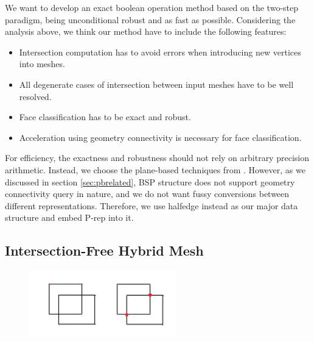 \documentclass[10pt,journal,compsoc]{IEEEtran}
\begin{document}
We want to develop an exact boolean operation method based on the two-step paradigm, being unconditional robust and as fast as possible. Considering the analysis above, we think our method have to include the following features:
\begin{itemize}
    \item Intersection computation has to avoid errors when introducing new vertices into meshes.
    \item All degenerate cases of intersection between input meshes have to be well resolved.
    \item Face classification has to be exact and robust.
    \item Acceleration using geometry connectivity is necessary for face classification.
\end{itemize}

For efficiency, the exactness and robustness should not rely on arbitrary precision arithmetic. Instead, we choose the plane-based techniques from \cite{campen2010exact}. However, as we discussed in section \ref{sec:pbrelated}, BSP structure does not support geometry connectivity query in nature, and we do not want fussy conversions between different representations. Therefore, we use halfedge instead as our major data structure and embed P-rep into it.

\subsection{Intersection-Free Hybrid Mesh}

\begin{figure}[t]
\centering
\includegraphics[width=2.5in]{linkedhalfedge}
\caption{{\color{red}{Sketch: The Linked Halfedge structure}}}
\label{fig:linkedhalfedge}
\end{figure}

\end{document}
